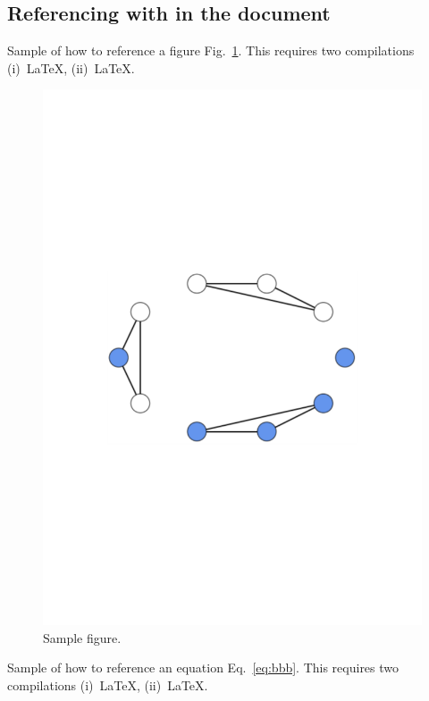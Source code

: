 \documentclass[10pt,journal,compsoc]{IEEEtran}
\theoremstyle{plain}
\theoremstyle{definition}
\theoremstyle{remark}
\newcommand{\reffig}[1]{Fig.~\ref{#1}}
\newcommand{\refeq}[1]{Eq.~\ref{#1}}
\begin{document}
\subsection{Referencing with in the document}

Sample of how to reference a figure \reffig{fig:sampleA}.
This requires two compilations 
(i)~LaTeX, 
(ii)~LaTeX.

\begin{figure}[htbp]
\begin{center}
	\includegraphics[width=\columnwidth]
		{Fig-1-SampleA}
	\caption{Sample figure.}
	\label{fig:sampleA}
\end{center}
\end{figure}


Sample of how to reference an equation \refeq{eq:bbb}.
This requires two compilations 
(i)~LaTeX, 
(ii)~LaTeX.
\end{document}
